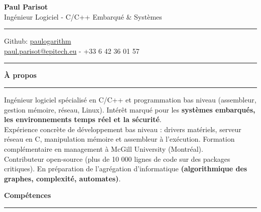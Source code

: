 \documentclass[9pt]{extarticle}
\begin{document}
\begin{center}
	{\huge\bfseries Paul Parisot}
	\\[4pt]
	{\Large Ingénieur Logiciel - C/C++ Embarqué \& Systèmes}
	\\
\end{center}

\par\vspace{-5pt}
\rule{\linewidth}{0.4pt}
\par\vspace{-5pt}

\begin{center}
	Github: \href{https://github.com/paulogarithm}{paulogarithm}
	\\
	\href{mailto:paul.parisot@epitech.eu}{paul.parisot@epitech.eu} - +33 6 42 36 01 57
	\\
\end{center}

\par\vspace{-10pt}
\rule{\linewidth}{0.4pt}
\par\vspace{7pt}

{\large\bfseries À propos}
\par\vspace{-8pt}
\rule{\linewidth}{0.4pt}
\par\vspace{5pt}

Ingénieur logiciel spécialisé en C/C++ et programmation bas niveau (assembleur, gestion mémoire, réseau, Linux). Intérêt marqué pour les {\bfseries systèmes embarqués, les environnements temps réel et la sécurité}.
\\
Expérience concrète de développement bas niveau : drivers matériels, serveur réseau en C, manipulation mémoire et assembleur à l'exécution. Formation complémentaire en management à McGill University (Montréal).
\\
Contributeur open-source (plus de 10 000 lignes de code sur des packages critiques). En préparation de l'agrégation d'informatique {\bfseries (algorithmique des graphes, complexité, automates)}.
\par\vspace{5pt}

{\large\bfseries Compétences}
\par\vspace{-8pt}
\rule{\linewidth}{0.4pt}
\par\vspace{5pt}
\end{document}
